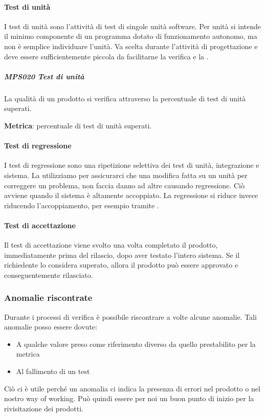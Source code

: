 			\paragraph{Test di unità} \label{testunita}
			I test di unità sono l'attività di test di singole unità software.
			Per unità si intende il minimo componente di un programma dotato di funzionamento autonomo, ma non è semplice individuare l'unità.
			Va scelta durante l'attività di progettazione e deve essere sufficientemente piccola da facilitarne la verifica e la .

            \subparagraph{MPS020 Test di unità}\label{testunita:met}
            La qualità di un prodotto si verifica attraverso la percentuale di test di unità superati.

            \textbf{Metrica}: percentuale di test di unità superati.

			\paragraph{Test di regressione} \label{testregressione}
			I test di regressione sono una ripetizione selettiva dei test di unità, integrazione e sistema.
			La utilizziamo per assicurarci che una modifica fatta su un unità per correggere un problema, non faccia danno ad altre causando regressione.
			Ciò avviene quando il sistema è altamente accoppiato.
			La regressione si riduce invece riducendo l'accoppiamento, per esempio tramite .

			\paragraph{Test di accettazione} \label{testaccettazione}
			Il test di accettazione viene svolto una volta completato il prodotto, immediatamente prima del rilascio, dopo aver testato l'intero sistema.
			Se il richiedente lo considera superato, allora il prodotto può essere approvato e conseguentemente rilasciato.


		\subsubsection{Anomalie riscontrate}\label{Anomalie}
		Durante i processi di verifica è possibile riscontrare a volte alcune anomalie.
		Tali anomalie posso essere dovute:
		\begin{itemize}
			\item A qualche valore preso come riferimento diverso da quello prestabilito per la metrica
			\item Al fallimento di un test
		\end{itemize}
		Ciò ci è utile perché un anomalia ci indica la presenza di errori nel prodotto o nel nostro way of working. Può quindi essere per noi un buon punto di inizio per la rivisitazione dei prodotti.
